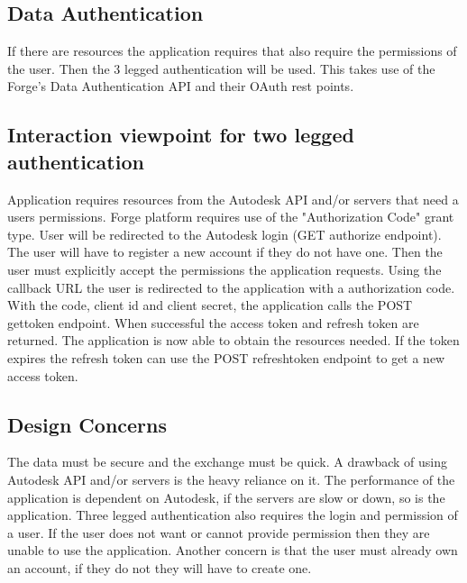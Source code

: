 \documentclass[letterpaper, 10pt, draftclsnofoot, compsoc, onecolumn]{IEEEtran}
\begin{document}
\subsection{Data Authentication}
\label{Three legged} 
	If there are resources the application requires that also require the permissions of the user. Then the 3 legged authentication will be used. This takes use of the Forge's Data Authentication API and their OAuth rest points. 
\subsection{Interaction viewpoint for two legged authentication}
	Application requires resources from the Autodesk API and/or servers that need a users permissions. Forge platform requires use of the "Authorization Code" grant type. User will be redirected to the Autodesk login (GET authorize endpoint). The user will have to register a new account if they do not have one. Then the user must explicitly accept the permissions the application requests. Using the callback URL the user is redirected to the application with a authorization code. With the code, client id and client secret, the application calls the POST gettoken endpoint. When successful the access token and refresh token are returned. The application is now able to obtain the resources needed. If the token expires the refresh token can use the POST refreshtoken endpoint to get a new access token. 
\subsection{Design Concerns}
	The data must be secure and the exchange must be quick. A drawback of using Autodesk API and/or servers is the heavy reliance on it. The performance of the application is dependent on Autodesk, if the servers are slow or down, so is the application. Three legged authentication also requires the login and permission of a user. If the user does not want or cannot provide permission then they are unable to use the application. Another concern is that the user must already own an account, if they do not they will have to create one. 
\end{document}
